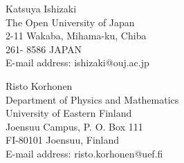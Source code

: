 \documentclass{amsart}
\begin{document}
\noindent
Katsuya Ishizaki\\
The Open University of Japan\\
2-11 Wakaba, Mihama-ku, Chiba\\
261- 8586 JAPAN\\
E-mail address: ishizaki@ouj.ac.jp
\vspace{0.5cm}

\noindent
Risto Korhonen\\
Department of Physics and Mathematics\\
University of Eastern Finland\\
Joensuu Campus, P. O. Box 111\\
FI-80101 Joensuu, Finland\\
E-mail address: risto.korhonen@uef.fi



%
\end{document}
